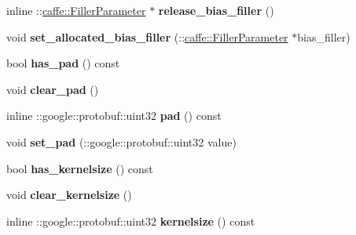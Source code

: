 \begin{DoxyCompactItemize}
\item 
\mbox{\label{classcaffe_1_1_v0_layer_parameter_acb0c7bc6f4c148a2f1fb12514834c7e1}} 
inline \+::\mbox{\hyperlink{classcaffe_1_1_filler_parameter}{caffe\+::\+Filler\+Parameter}} $\ast$ {\bfseries release\+\_\+bias\+\_\+filler} ()
\item 
\mbox{\label{classcaffe_1_1_v0_layer_parameter_a8e45c37a495be106bd3a6bcfd3d71f26}} 
void {\bfseries set\+\_\+allocated\+\_\+bias\+\_\+filler} (\+::\mbox{\hyperlink{classcaffe_1_1_filler_parameter}{caffe\+::\+Filler\+Parameter}} $\ast$bias\+\_\+filler)
\item 
\mbox{\label{classcaffe_1_1_v0_layer_parameter_a9843700ea6997b82128f9e1e2dcf522c}} 
bool {\bfseries has\+\_\+pad} () const
\item 
\mbox{\label{classcaffe_1_1_v0_layer_parameter_a6b7b9060a425465167dbf28154b17b0c}} 
void {\bfseries clear\+\_\+pad} ()
\item 
\mbox{\label{classcaffe_1_1_v0_layer_parameter_ada777881c65b841e3cd7dde3df19eb9a}} 
inline \+::google\+::protobuf\+::uint32 {\bfseries pad} () const
\item 
\mbox{\label{classcaffe_1_1_v0_layer_parameter_adc7cd6b531424e8c991956ea366f68da}} 
void {\bfseries set\+\_\+pad} (\+::google\+::protobuf\+::uint32 value)
\item 
\mbox{\label{classcaffe_1_1_v0_layer_parameter_a1f7746aeda4d702f2626d264dec8927b}} 
bool {\bfseries has\+\_\+kernelsize} () const
\item 
\mbox{\label{classcaffe_1_1_v0_layer_parameter_a32f3d73b0a5808d760c980c75f487b41}} 
void {\bfseries clear\+\_\+kernelsize} ()
\item 
\mbox{\label{classcaffe_1_1_v0_layer_parameter_ab55b0180ce97eada3f5dc3a5e1d0e7d4}} 
inline \+::google\+::protobuf\+::uint32 {\bfseries kernelsize} () const
\item 

\end{DoxyCompactItemize}
